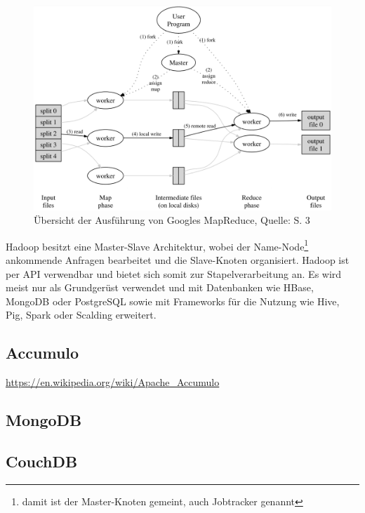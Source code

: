 \begin{figure}[h]
\centering
\includegraphics[width=\textwidth]{Abbildungen/mapreduce.png}
\caption[Übersicht der Ausführung von Googles MapReduce]{Übersicht der Ausführung von Googles MapReduce, Quelle: \cite{paper:mapreduce} S. 3}
\label{fig:mapreduce}
\end{figure}

Hadoop besitzt eine Master-Slave Architektur, wobei der Name-Node\footnote{damit ist der Master-Knoten gemeint, auch Jobtracker genannt} ankommende Anfragen bearbeitet und die Slave-Knoten organisiert.
Hadoop ist per API verwendbar und bietet sich somit zur Stapelverarbeitung an. %
Es wird meist nur als Grundgerüst verwendet und mit Datenbanken wie HBase, MongoDB oder PostgreSQL sowie mit Frameworks für die Nutzung wie Hive, Pig, Spark oder Scalding erweitert.





\subsection{Accumulo}
\url{https://en.wikipedia.org/wiki/Apache_Accumulo}

\subsection{MongoDB}

\subsection{CouchDB}

